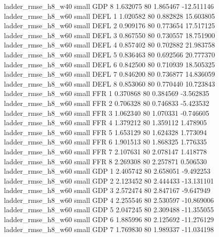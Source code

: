       ladder_rmse_h8_w40      small      GDP                 8 1.632075 80       1.865467         -12.511146
      ladder_rmse_h8_w60      small     DEFL                 1 1.020582 80       0.882828          15.603805
      ladder_rmse_h8_w60      small     DEFL                 2 0.909176 80       0.773654          17.517125
      ladder_rmse_h8_w60      small     DEFL                 3 0.867550 80       0.730557          18.751900
      ladder_rmse_h8_w60      small     DEFL                 4 0.857402 80       0.702882          21.983758
      ladder_rmse_h8_w60      small     DEFL                 5 0.836463 80       0.692566          20.777370
      ladder_rmse_h8_w60      small     DEFL                 6 0.842500 80       0.710939          18.505325
      ladder_rmse_h8_w60      small     DEFL                 7 0.846200 80       0.736877          14.836059
      ladder_rmse_h8_w60      small     DEFL                 8 0.853060 80       0.770440          10.723843
      ladder_rmse_h8_w60      small      FFR                 1 0.370868 80       0.384569          -3.562835
      ladder_rmse_h8_w60      small      FFR                 2 0.706328 80       0.746833          -5.423532
      ladder_rmse_h8_w60      small      FFR                 3 1.062340 80       1.070331          -0.746605
      ladder_rmse_h8_w60      small      FFR                 4 1.379212 80       1.359112           1.478905
      ladder_rmse_h8_w60      small      FFR                 5 1.653129 80       1.624328           1.773094
      ladder_rmse_h8_w60      small      FFR                 6 1.901513 80       1.868325           1.776335
      ladder_rmse_h8_w60      small      FFR                 7 2.107631 80       2.078147           1.418778
      ladder_rmse_h8_w60      small      FFR                 8 2.269308 80       2.257871           0.506530
      ladder_rmse_h8_w60      small      GDP                 1 2.405742 80       2.658051          -9.492253
      ladder_rmse_h8_w60      small      GDP                 2 2.123452 80       2.444433         -13.131101
      ladder_rmse_h8_w60      small      GDP                 3 2.572474 80       2.847167          -9.647949
      ladder_rmse_h8_w60      small      GDP                 4 2.255546 80       2.530597         -10.869006
      ladder_rmse_h8_w60      small      GDP                 5 2.047245 80       2.309488         -11.355055
      ladder_rmse_h8_w60      small      GDP                 6 1.885996 80       2.125692         -11.276129
      ladder_rmse_h8_w60      small      GDP                 7 1.769830 80       1.989337         -11.034198

